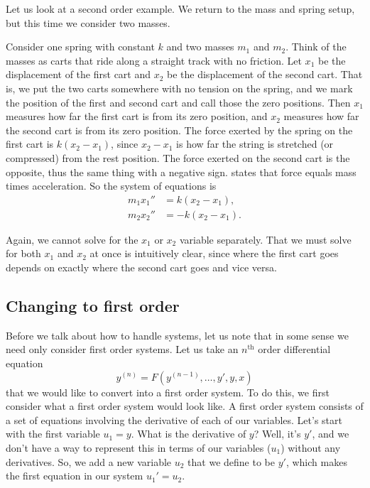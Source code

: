 \begin{example} \label{sintro:carts-example}
Let us look at a second order example.
We return to the mass and spring setup, but this time we
consider two masses.

\begin{mywrapfigsimp}{2.0in}{2.3in}
\noindent
{}
\end{mywrapfigsimp}
Consider one spring with constant $k$ and two masses $m_1$
and $m_2$.  Think of the masses as carts that 
ride along a straight track with no friction.  Let $x_1$ be the displacement of the first
cart and $x_2$ be the displacement of the second cart.
That is, we put the two
carts somewhere with no tension on the spring, and we mark the position of
the first and second cart and call those the zero positions.
Then $x_1$ measures how far the first cart is from its zero position,
and $x_2$ measures how far the second cart is from its zero position.
The force exerted by the spring on the first cart is
$k(x_2-x_1)$,
since $x_2-x_1$ is how far the string is stretched (or compressed) from
the rest position.  The force exerted on the second cart is the opposite,
thus the same thing with a negative sign.
 states that
force equals mass times acceleration.  So the system of equations is
\begin{align*}
m_1 x_1'' & = k(x_2-x_1) , \\
m_2 x_2'' & = - k(x_2-x_1) .
\end{align*}

Again, we cannot solve for the $x_1$ or $x_2$ variable separately.
That we must solve for both $x_1$ and $x_2$ at once
is intuitively clear, since where the first cart goes
depends on exactly where the second cart goes and vice versa.
\end{example}

\subsection{Changing to first order}

Before we talk about how to handle systems, let us note that
in some sense
we need only consider first order systems.
Let us
take an $n^{\text{th}}$ order differential equation
\begin{equation*}
y^{(n)} = F(y^{(n-1)},\ldots,y',y,x)
\end{equation*}
that we would like to convert into a first order system. To do this, we first consider what a first order system would look like. A first order system consists of a set of equations involving the derivative of each of our variables. Let's start with the first variable $u_1= y$. What is the derivative of $y$? Well, it's $y'$, and we don't have a way to represent this in terms of our variables ($u_1$) without any derivatives. So, we add a new variable $u_2$ that we define to be $y'$, which makes the first equation in our system $u_1' = u_2$. 

